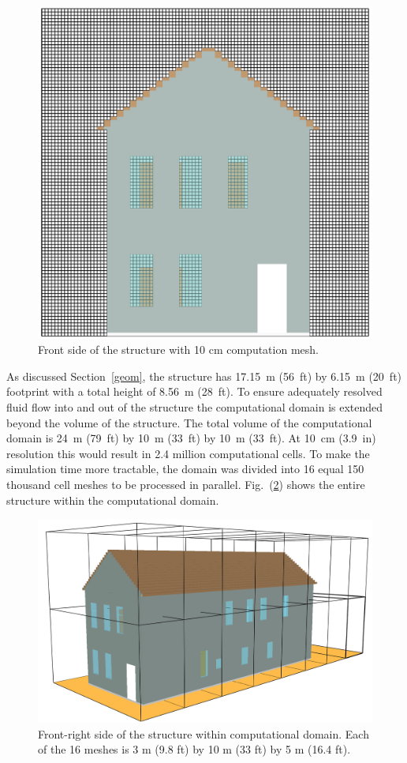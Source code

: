 \documentclass[11pt,oneside]{book}
\begin{document}
\begin{figure}[h!]
\centering
\includegraphics[width=.60\textwidth]{../Figures/smv_exterior_grid}
\caption{Front side of the structure with 10 cm computation mesh.}
\label{fig:geom_grid}
\end{figure}

As discussed Section~\ref{geom}, the structure has 17.15~m (56~ft) by 6.15~m (20~ft) footprint with a total height of 8.56~m (28~ft). To ensure adequately resolved fluid flow into and out of the structure the computational domain is extended beyond the volume of the structure. The total volume of the computational domain is 24~m (79~ft) by 10~m (33~ft) by 10~m (33~ft). At 10~cm (3.9~in) resolution this would result in 2.4 million computational cells. To make the simulation time more tractable, the domain was divided into 16 equal 150 thousand cell meshes to be processed in parallel. Fig.~(\ref{fig:mult_mesh}) shows the entire structure within the computational domain.

\begin{figure}[h!]
\centering
\includegraphics[width=.60\textwidth]{../Figures/smv_exterior_mesh}
\caption{Front-right side of the structure within computational domain. Each of the 16 meshes is 3 m (9.8 ft) by 10 m (33 ft) by 5 m (16.4 ft).}
\label{fig:mult_mesh}
\end{figure}
\end{document}
